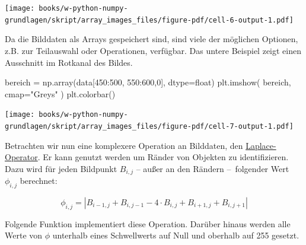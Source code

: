 \documentclass[
  letterpaper,
  DIV=11,
  numbers=noendperiod]{scrreprt}
\newenvironment{Shaded}{\begin{snugshade}}{\end{snugshade}}
\newcommand{\BuiltInTok}[1]{\textcolor[rgb]{0.00,0.23,0.31}{#1}}
\newcommand{\DecValTok}[1]{\textcolor[rgb]{0.68,0.00,0.00}{#1}}
\newcommand{\NormalTok}[1]{\textcolor[rgb]{0.00,0.23,0.31}{#1}}
\newcommand{\OperatorTok}[1]{\textcolor[rgb]{0.37,0.37,0.37}{#1}}
\newcommand{\StringTok}[1]{\textcolor[rgb]{0.13,0.47,0.30}{#1}}
\begin{document}
\texttt{[image: books/w-python-numpy-grundlagen/skript/array\_images\_files/figure-pdf/cell-6-output-1.pdf]}

Da die Bilddaten als Arrays gespeichert sind, sind viele der möglichen
Optionen, z.B. zur Teilauswahl oder Operationen, verfügbar. Das untere
Beispiel zeigt einen Ausschnitt im Rotkanal des Bildes.

\begin{Shaded}
\begin{Highlighting}[]
\NormalTok{bereich }\OperatorTok{=}\NormalTok{ np.array(data[}\DecValTok{450}\NormalTok{:}\DecValTok{500}\NormalTok{, }\DecValTok{550}\NormalTok{:}\DecValTok{600}\NormalTok{,}\DecValTok{0}\NormalTok{], dtype}\OperatorTok{=}\BuiltInTok{float}\NormalTok{)}
\NormalTok{plt.imshow( bereich, cmap}\OperatorTok{=}\StringTok{"Greys"}\NormalTok{ )}
\NormalTok{plt.colorbar()}
\end{Highlighting}
\end{Shaded}

\texttt{[image: books/w-python-numpy-grundlagen/skript/array\_images\_files/figure-pdf/cell-7-output-1.pdf]}

Betrachten wir nun eine komplexere Operation an Bilddaten, den
\href{https://de.wikipedia.org/wiki/Laplace-Operator}{Laplace-Operator}.
Er kann genutzt werden um Ränder von Objekten zu identifizieren. Dazu
wird für jeden Bildpunkt \(B_{i,j}\) -- außer an den Rändern
--~folgender Wert \(\phi_{i, j}\) berechnet:

\[ \phi_{i, j} = \left|B_{i-1, j} + B_{i, j-1} - 4\cdot B_{i, j} + B_{i+1, j} + B_{i, j+1}\right| \]

Folgende Funktion implementiert diese Operation. Darüber hinaus werden
alle Werte von \(\phi\) unterhalb eines Schwellwerts auf Null und
oberhalb auf 255 gesetzt.
\end{document}
